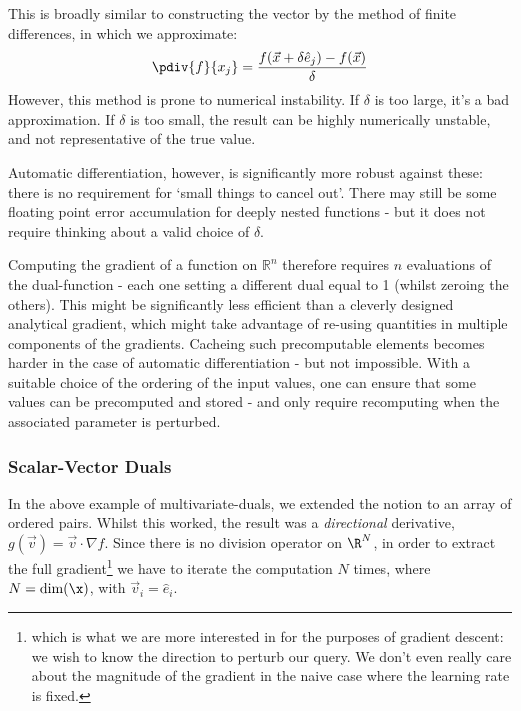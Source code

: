                \begin{aside}
                    This is broadly similar to constructing the vector by the method of finite differences, in which we approximate:
                    \begin{equation}
                        \pdiv{f}{x_j} = \frac{f(\vec{x} + \delta\hat{e}_j) - f(\vec{x})}{\delta}
                    \end{equation}
                    However, this method is prone to numerical instability. If $\delta$ is too large, it's a bad approximation. If $\delta$ is too small, the result can be highly numerically unstable, and not representative of the true value. 

                    Automatic differentiation, however, is significantly more robust against these: there is no requirement for `small things to cancel out'. There may still be some floating point error accumulation for deeply nested functions - but it does not require thinking about a valid choice of $\delta$.

                    Computing the gradient of a function on $\mathbb{R}^n$ therefore requires $n$ evaluations of the dual-function - each one setting a different dual equal to 1 (whilst zeroing the others). This might be significantly less efficient than a cleverly designed analytical gradient, which might take advantage of re-using quantities in multiple components of the gradients. Cacheing such precomputable elements becomes harder in the case of automatic differentiation - but not impossible. With a suitable choice of the ordering of the input values, one can ensure that some values can be precomputed and stored - and only require recomputing when the associated parameter is perturbed.  
                \end{aside} 

        \subsubsection{Scalar-Vector Duals}

            In the above example of multivariate-duals, we extended the notion to an array of ordered pairs. Whilst this worked, the result was a \textit{directional} derivative, $g(\vec{v}) = \vec{v} \cdot \nabla f$. Since there is no division operator on $\R^N$, in order to extract the full gradient\footnote{which is what we are more interested in for the purposes of gradient descent: we wish to know the direction to perturb our query. We don't even really care about the magnitude of the gradient in the naive case where the learning rate is fixed.} we have to iterate the computation $N$ times, where $N = \text{dim}(\x)$, with $\vec{v}_i = \hat{e}_i$.

